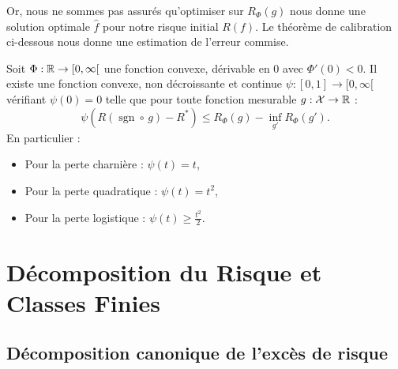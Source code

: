 Or, nous ne sommes pas assurés qu'optimiser sur $R_\Phi(g)$ nous donne une solution optimale $ \hat{f}$ pour notre risque initial $ R(f)$. Le théorème de calibration ci-dessous nous donne une estimation de l'erreur commise. 

\begin{theorem}
    Soit $\Phi : \mathbb{R} \to [0, \infty[$ une fonction convexe, dérivable en 0 avec $\Phi'(0) < 0$. Il existe une fonction convexe, non décroissante et continue $\psi : [0, 1] \to [0, \infty[$ vérifiant $\psi(0) = 0$ telle que pour toute fonction mesurable $g : \mathcal{X} \to \mathbb{R}$ :
    \begin{equation}
        \psi\left( R(\operatorname{sgn} \circ \, g) - R^* \right) \leqslant R_\Phi(g) - \inf_{g'} R_\Phi(g').
    \end{equation}
    En particulier :
    \begin{itemize}
        \item Pour la perte charnière : $\psi(t) = t$,
        \item Pour la perte quadratique : $\psi(t) = t^2$,
        \item Pour la perte logistique : $\psi(t) \geqslant \frac{t^2}{2}$.
    \end{itemize}
\end{theorem}


\section{Décomposition du Risque et Classes Finies}

\subsection{Décomposition canonique de l'excès de risque}

